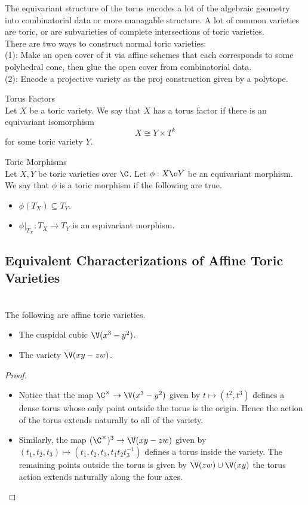 \documentclass[a4paper]{article}
\begin{document}
The equivariant structure of the torus encodes a lot of the algebraic geometry into combinatorial data or more managable structure. A lot of common varieties are toric, or are subvarieties of complete intersections of toric varieties. \\

There are two ways to construct normal toric varieties: \\

(1): Make an open cover of it via affine schemes that each corresponds to some polyhedral cone, then glue the open cover from combinatorial data. \\

(2): Encode a projective variety as the proj construction given by a polytope. 

\begin{defn}{Torus Factors}{}\\
Let $X$ be a toric variety. We say that $X$ has a torus factor if there is an equivariant isomorphism $$X\cong Y\times T^k$$ for some toric variety $Y$. 
\end{defn}

\begin{defn}{Toric Morphisms}{}\\
Let $X,Y$ be toric varieties over $\C$. Let $\phi:X\o Y$ be an equivariant morphism. We say that $\phi$ is a toric morphism if the following are true. 
\begin{itemize}
\item $\phi(T_X)\subseteq T_Y$. 
\item $\phi|_{T_X}:T_X\to T_Y$ is an equivariant morphism. 
\end{itemize}
\end{defn}

\subsection{Equivalent Characterizations of Affine Toric Varieties}
\begin{eg}{}{}\\
The following are affine toric varieties. 
\begin{itemize}
\item The cuspidal cubic $\V(x^3-y^2)$. 
\item The variety $\V(xy-zw)$. 
\end{itemize}
\begin{proof}
\begin{itemize}
\item Notice that the map $\C^\times\to\V(x^3-y^2)$ given by $t\mapsto(t^2,t^3)$ defines a dense torus whose only point outside the torus is the origin. Hence the action of the torus extends naturally to all of the variety. 
\item Similarly, the map $(\C^\times)^3\to\V(xy-zw)$ given by $(t_1,t_2,t_3)\mapsto(t_1,t_2,t_3,t_1t_2t_3^{-1})$ defines a torus inside the variety. The remaining points outside the torus is given by $\V(zw)\cup\V(xy)$ the torus action extends naturally along the four axes. 
\end{itemize}
\end{proof}
\end{eg}
\end{document}
